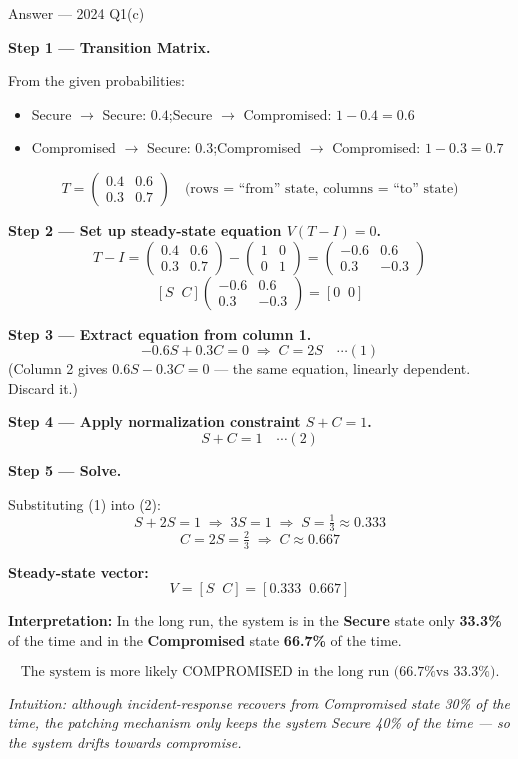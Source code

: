 \documentclass[12pt,a4paper]{article}
\begin{document}
\begin{solbox}{Answer --- 2024 Q1(c)}

\textbf{Step 1 --- Transition Matrix.}

From the given probabilities:
\begin{itemize}[noitemsep]
  \item Secure $\to$ Secure: $0.4$;\quad Secure $\to$ Compromised: $1 - 0.4 = 0.6$
  \item Compromised $\to$ Secure: $0.3$;\quad Compromised $\to$ Compromised: $1 - 0.3 = 0.7$
\end{itemize}
\[
T = \begin{pmatrix} 0.4 & 0.6 \\ 0.3 & 0.7 \end{pmatrix}
\quad\text{(rows = ``from'' state, columns = ``to'' state)}
\]

\textbf{Step 2 --- Set up steady-state equation $V(T - I) = 0$.}
\[
T - I = \begin{pmatrix} 0.4 & 0.6 \\ 0.3 & 0.7 \end{pmatrix} - \begin{pmatrix} 1 & 0 \\ 0 & 1 \end{pmatrix} = \begin{pmatrix} -0.6 & 0.6 \\ 0.3 & -0.3 \end{pmatrix}
\]
\[
[S \;\; C]\begin{pmatrix} -0.6 & 0.6 \\ 0.3 & -0.3 \end{pmatrix} = [0 \;\; 0]
\]

\textbf{Step 3 --- Extract equation from column 1.}
\[
-0.6S + 0.3C = 0 \;\Rightarrow\; C = 2S \quad \cdots (1)
\]
(Column 2 gives $0.6S - 0.3C = 0$ --- the same equation, linearly dependent. Discard it.)

\textbf{Step 4 --- Apply normalization constraint $S + C = 1$.}
\[
S + C = 1 \quad \cdots (2)
\]

\textbf{Step 5 --- Solve.}

Substituting (1) into (2):
\[
S + 2S = 1 \;\Rightarrow\; 3S = 1 \;\Rightarrow\; \boxed{S = \tfrac{1}{3} \approx 0.333}
\]
\[
C = 2S = \tfrac{2}{3} \;\Rightarrow\; \boxed{C \approx 0.667}
\]

\textbf{Steady-state vector:}
\[
V = [S \;\; C] = [0.333 \;\; 0.667]
\]

\textbf{Interpretation:} In the long run, the system is in the \textbf{Secure} state only \textbf{33.3\%} of the time and in the \textbf{Compromised} state \textbf{66.7\%} of the time.

\[
\boxed{\text{The system is more likely COMPROMISED in the long run (66.7\% vs 33.3\%).}}
\]

\textit{Intuition: although incident-response recovers from Compromised state 30\% of the time, the patching mechanism only keeps the system Secure 40\% of the time --- so the system drifts towards compromise.}
\end{solbox}
\end{document}
